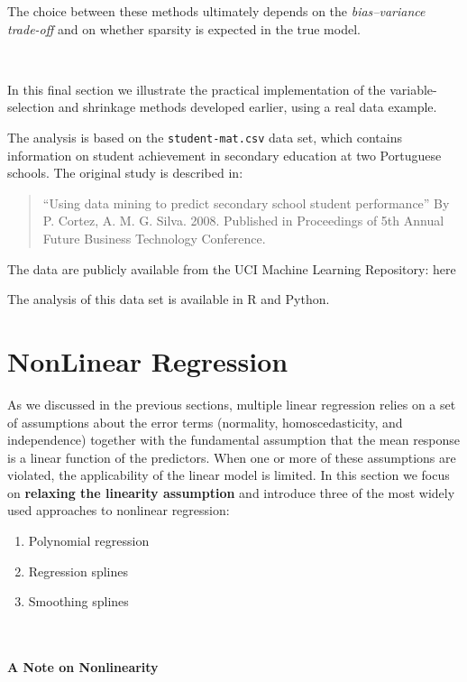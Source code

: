 \documentclass[
]{book}
\providecommand{\tightlist}{%
  \setlength{\itemsep}{0pt}\setlength{\parskip}{0pt}}
\begin{document}
The choice between these methods ultimately depends on the \emph{bias--variance trade-off} and on whether sparsity is expected in the true model.

~

In this final section we illustrate the practical implementation of the variable-selection and shrinkage methods developed earlier, using a real data example.

The analysis is based on the \texttt{student-mat.csv} data set, which contains information on student achievement in secondary education at two Portuguese schools. The original study is described in:

\begin{quote}
``Using data mining to predict secondary school student performance''
By P. Cortez, A. M. G. Silva. 2008. Published in Proceedings of 5th Annual Future Business Technology Conference.
\end{quote}

The data are publicly available from the UCI Machine Learning Repository: here

The analysis of this data set is available in R and Python.

\chapter{NonLinear Regression}\label{nonlinear-regression}

As we discussed in the previous sections, multiple linear regression relies on a set of assumptions about the error terms (normality, homoscedasticity, and independence) together with the fundamental assumption that the mean response is a linear function of the predictors. When one or more of these assumptions are violated, the applicability of the linear model is limited. In this section we focus on \textbf{relaxing the linearity assumption} and introduce three of the most widely used approaches to nonlinear regression:

\begin{enumerate}
\def\labelenumi{(\roman{enumi})}
\tightlist
\item
  Polynomial regression
\item
  Regression splines
\item
  Smoothing splines
\end{enumerate}

~
~

\subsubsection*{A Note on Nonlinearity}\label{a-note-on-nonlinearity}
\end{document}
